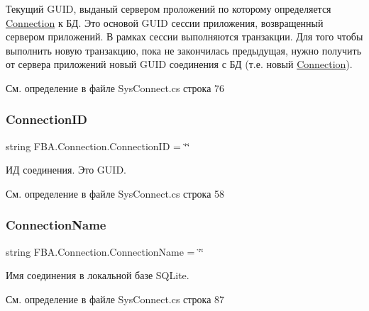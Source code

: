 Текущий G\+U\+ID, выданый сервером проложений по которому определяется \mbox{\hyperlink{class_f_b_a_1_1_connection}{Connection}} к БД. Это основой G\+U\+ID сессии приложения, возвращенный сервером приложений. В рамках сессии выполняются транзакции. Для того чтобы выполнить новую транзакцию, пока не закончилась предыдущая, нужно получить от сервера приложений новый G\+U\+ID соединения с БД (т.\+е. новый \mbox{\hyperlink{class_f_b_a_1_1_connection}{Connection}}). 



См. определение в файле Sys\+Connect.\+cs строка 76

\mbox{\label{class_f_b_a_1_1_connection_ad362a30163e3a237460e0d5b2cb124d2}} 
\subsubsection{\texorpdfstring{Connection\+ID}{ConnectionID}}
{\footnotesize\ttfamily string F\+B\+A.\+Connection.\+Connection\+ID = \char`\"{}\char`\"{}}



ИД соединения. Это G\+U\+ID. 



См. определение в файле Sys\+Connect.\+cs строка 58

\mbox{\label{class_f_b_a_1_1_connection_aae6e7e372a0df905fdbe5ae1844d3279}} 
\subsubsection{\texorpdfstring{Connection\+Name}{ConnectionName}}
{\footnotesize\ttfamily string F\+B\+A.\+Connection.\+Connection\+Name = \char`\"{}\char`\"{}}



Имя соединения в локальной базе S\+Q\+Lite. ~\newline




См. определение в файле Sys\+Connect.\+cs строка 87

\mbox{\label{class_f_b_a_1_1_connection_aa20952e5caba14009de078611bffc06e}} 
